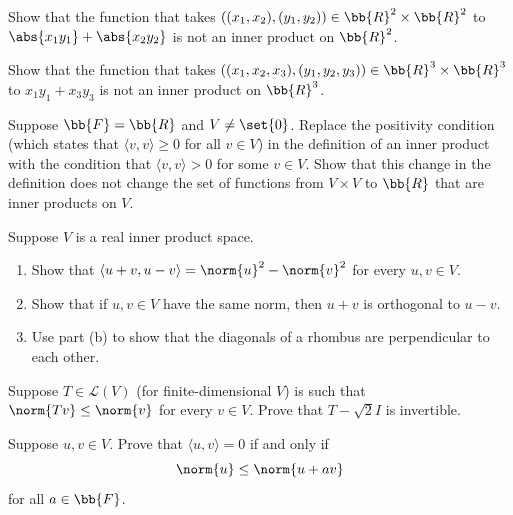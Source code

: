 \documentclass[12pt,letterpaper]{hmcpset}
\begin{document}
\begin{problem}[1]
	Show that the function that takes $((x_1, x_2), (y_1, y_2)) \in \bb{R}^2 \times \bb{R}^2$ to $\abs{x_1 y_1} + \abs{x_2 y_2}$ is not an inner product on $\bb{R}^2$.
\end{problem}

\pagebreak

\begin{problem}[2]
	Show that the function that takes $((x_1, x_2, x_3), (y_1, y_2, y_3)) \in \bb{R}^3 \times \bb{R}^3$ to $x_1 y_1 + x_3 y_3$ is not an inner product on $\bb{R}^3$. 
\end{problem}

\pagebreak

\begin{problem}[3]
	Suppose $\bb{F} = \bb{R}$ and $V \neq \set{0}$. Replace the positivity condition (which states that $\langle v, v \rangle \ge 0$ for all $v \in V$) in the definition of an inner product with the condition that $\langle v, v \rangle > 0$ for some $v \in V$. Show that this change in the definition does not change the set of functions from $V \times V$ to $\bb{R}$ that are inner products on $V$.
\end{problem}

\pagebreak

\begin{problem}[4]
	Suppose $V$ is a real inner product space.
	\begin{enumerate}
		\item Show that $\langle u + v, u - v \rangle = \norm{u}^2 - \norm{v}^2$ for every $u, v \in V$.
		\item Show that if $u, v \in V$ have the same norm, then $u + v$ is orthogonal to $u - v$.
		\item Use part (b) to show that the diagonals of a rhombus are perpendicular to each other.
	\end{enumerate}
\end{problem}

\pagebreak

\begin{problem}[5]
	Suppose $T \in \mathcal{L}(V)$ (for finite-dimensional $V$) is such that $\norm{Tv} \le \norm{v}$ for every $v \in V$. Prove that $T - \sqrt{2} I$ is invertible.
\end{problem}

\pagebreak

\begin{problem}[6]
	Suppose $u, v \in V$. Prove that $\langle u, v \rangle = 0$ if and only if
	\[
		\norm{u} \le \norm{u + av}
	\]
	for all $a \in \bb{F}$.
\end{problem}
\end{document}
